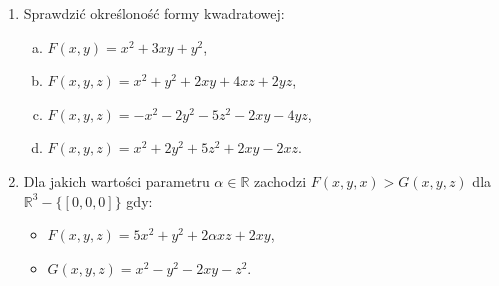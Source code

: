 \documentclass{article}
\begin{document}
\begin{enumerate}
\item Sprawdzić określoność formy kwadratowej:
    \begin{enumerate}[a)]
        \item $F(x, y) = x^2 + 3xy + y^2$,
        \item $F(x, y, z) = x^2 + y^2 + 2xy + 4xz + 2yz$,
        \item $F(x, y, z) = -x^{2} - 2y^{2} - 5z^{2} - 2xy - 4yz$,
        \item $F(x, y, z) = x^{2} + 2y^{2} + 5z^{2} + 2xy - 2xz$.
    \end{enumerate}
    
\item Dla jakich wartości parametru $\alpha \in \mathbb{R}$ zachodzi $F(x, y, x) > G(x, y, z)$ dla $\mathbb{R}^{3} - \{ [0, 0, 0] \}$
gdy:
    \begin{itemize}
        \item $F(x, y, z) = 5x^{2} + y^{2}  + 2\alpha xz + 2xy$,
        \item $G(x, y, z) = x^{2} - y^{2}  - 2xy - z^{2}$.
    \end{itemize} 

\end{enumerate}
    
\end{document}
